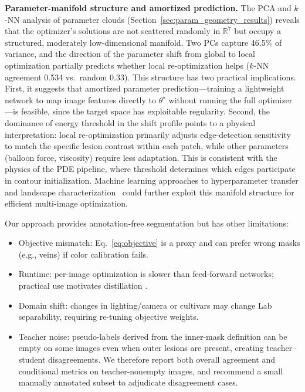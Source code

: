 \documentclass[journal]{IEEEtran}
\newcommand{\R}{\mathbb{R}}
\begin{document}
\textbf{Parameter-manifold structure and amortized prediction.}
The PCA and $k$-NN analysis of parameter clouds (Section~\ref{sec:param_geometry_results}) reveals that the optimizer's solutions are not scattered randomly in $\R^7$ but occupy a structured, moderately low-dimensional manifold. Two PCs capture 46.5\% of variance, and the direction of the parameter shift from global to local optimization partially predicts whether local re-optimization helps ($k$-NN agreement 0.534 vs.\ random 0.33). This structure has two practical implications. First, it suggests that amortized parameter prediction---training a lightweight network to map image features directly to $\theta^\star$ without running the full optimizer---is feasible, since the target space has exploitable regularity. Second, the dominance of energy threshold in the shift profile points to a physical interpretation: local re-optimization primarily adjusts edge-detection sensitivity to match the specific lesion contrast within each patch, while other parameters (balloon force, viscosity) require less adaptation. This is consistent with the physics of the PDE pipeline, where threshold determines which edges participate in contour initialization. Machine learning approaches to hyperparameter transfer and landscape characterization~\cite{yu2020hyperparam,singh2016machine} could further exploit this manifold structure for efficient multi-image optimization.

Our approach provides annotation-free segmentation but has other limitations:
\begin{itemize}
    \item Objective mismatch: Eq.~\eqref{eq:objective} is a proxy and can prefer wrong masks (e.g., veins) if color calibration fails.
    \item Runtime: per-image optimization is slower than feed-forward networks; practical use motivates distillation \cite{hinton2015distilling}.
    \item Domain shift: changes in lighting/camera or cultivars may change Lab separability, requiring re-tuning objective weights.
    \item Teacher noise: pseudo-labels derived from the inner-mask definition can be empty on some images even when outer lesions are present, creating teacher--student disagreements. We therefore report both overall agreement and conditional metrics on teacher-nonempty images, and recommend a small manually annotated subset to adjudicate disagreement cases.
\end{itemize}
\end{document}
